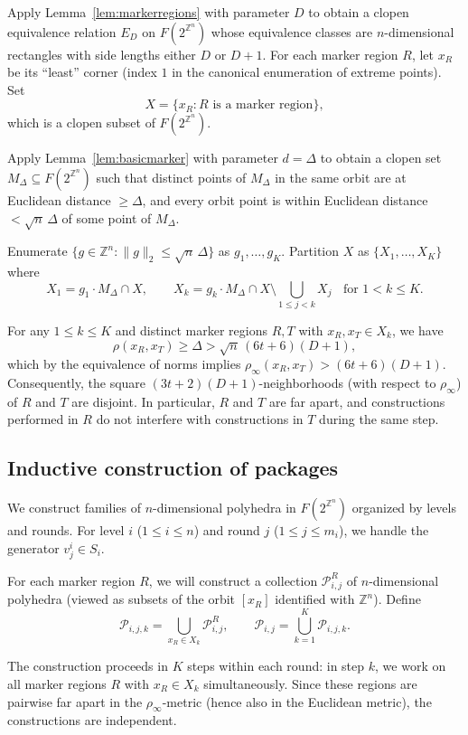 \documentclass[10pt,a4paper]{amsart}
\begin{document}
Apply Lemma~\ref{lem:markerregions} with parameter $D$ to obtain a clopen
equivalence relation $E_D$ on $F(2^{\mathbb{Z}^n})$ whose equivalence
classes are $n$-dimensional rectangles with side
lengths either $D$ or $D+1$. For each marker region $R$, let $x_R$ be its
``least'' corner (index $1$ in the canonical enumeration of extreme
points). Set
\[
X=\{x_R\colon R\text{ is a marker region}\},
\]
which is a clopen subset of $F(2^{\mathbb{Z}^n})$.

Apply Lemma~\ref{lem:basicmarker} with parameter $d=\Delta$ to obtain a
clopen set $M_\Delta\subseteq F(2^{\mathbb{Z}^n})$ such that distinct
points of $M_\Delta$ in the same orbit are at Euclidean distance
$\geq\Delta$, and every orbit point is within Euclidean distance
$<\sqrt{n}\,\Delta$ of some point of $M_\Delta$.

Enumerate $\{g\in\mathbb{Z}^n\colon \|g\|_2\leq \sqrt{n}\,\Delta\}$ as
$g_1,\dots,g_K$. Partition $X$ as $\{X_1,\dots,X_K\}$ where
\[
X_1=g_1\cdot M_\Delta\cap X,\qquad
X_k=g_k\cdot M_\Delta\cap X\setminus
\bigcup_{1\leq j<k}X_j\;\; \mbox{ for $1<k\leq K$.}
\]

For any $1\leq k\leq K$ and distinct marker regions $R,T$ with
$x_R,x_T\in X_k$, we have
\[
\rho(x_R,x_T)\geq\Delta>\sqrt{n}\,(6t+6)(D+1),
\]
which by the equivalence of norms implies
$\rho_\infty(x_R,x_T)>(6t+6)(D+1)$. Consequently, the square
$(3t+2)(D+1)$-neighborhoods (with respect to $\rho_\infty$) of $R$ and
$T$ are disjoint. In particular, $R$ and $T$ are far apart, and
constructions performed in $R$ do not interfere with constructions in
$T$ during the same step.

\subsection{Inductive construction of packages}

We construct families of $n$-dimensional polyhedra in $F(2^{\mathbb{Z}^n})$
organized by levels and rounds. For level $i$ ($1\leq i\leq n$) and round
$j$ ($1\leq j\leq m_i$), we handle the generator $v_j^i\in S_i$.

For each marker region $R$, we will construct a collection
$\mathcal{P}_{i,j}^R$ of $n$-dimensional polyhedra (viewed as subsets of
the orbit $[x_R]$ identified with $\mathbb{Z}^n$). Define
\[
\mathcal{P}_{i,j,k}=\bigcup_{x_R\in X_k}\mathcal{P}_{i,j}^R,\qquad
\mathcal{P}_{i,j}=\bigcup_{k=1}^K\mathcal{P}_{i,j,k}.
\]

The construction proceeds in $K$ steps within each round: in step $k$, we
work on all marker regions $R$ with $x_R\in X_k$ simultaneously. Since
these regions are pairwise far apart in the $\rho_\infty$-metric (hence
also in the Euclidean metric), the constructions are independent.
\end{document}

